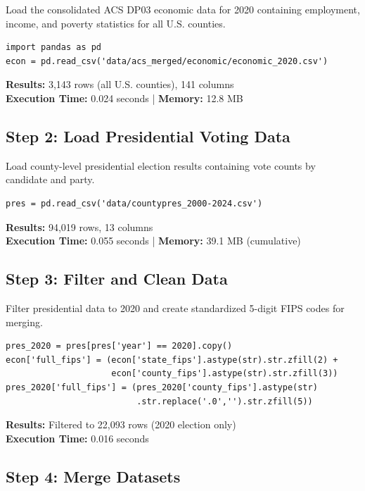\documentclass[9pt,a4paper,onecolumn,twoside]{tau-class/tau}
\begin{document}
Load the consolidated ACS DP03 economic data for 2020 containing employment, income, and poverty statistics for all U.S. counties.

\begin{lstlisting}
import pandas as pd
econ = pd.read_csv('data/acs_merged/economic/economic_2020.csv')
\end{lstlisting}

\textbf{Results:} 3,143 rows (all U.S. counties), 141 columns\\
\textbf{Execution Time:} 0.024 seconds | \textbf{Memory:} 12.8 MB

\subsection{Step 2: Load Presidential Voting Data}

Load county-level presidential election results containing vote counts by candidate and party.

\begin{lstlisting}
pres = pd.read_csv('data/countypres_2000-2024.csv')
\end{lstlisting}

\textbf{Results:} 94,019 rows, 13 columns\\
\textbf{Execution Time:} 0.055 seconds | \textbf{Memory:} 39.1 MB (cumulative)

\subsection{Step 3: Filter and Clean Data}

Filter presidential data to 2020 and create standardized 5-digit FIPS codes for merging.

\begin{lstlisting}
pres_2020 = pres[pres['year'] == 2020].copy()
econ['full_fips'] = (econ['state_fips'].astype(str).str.zfill(2) + 
                     econ['county_fips'].astype(str).str.zfill(3))
pres_2020['full_fips'] = (pres_2020['county_fips'].astype(str)
                          .str.replace('.0','').str.zfill(5))
\end{lstlisting}

\textbf{Results:} Filtered to 22,093 rows (2020 election only)\\
\textbf{Execution Time:} 0.016 seconds

\subsection{Step 4: Merge Datasets}
\end{document}
